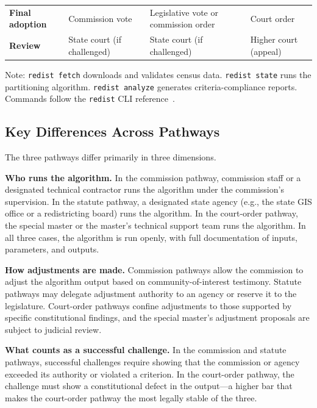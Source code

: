 \begin{table}[h]
\begin{threeparttable}
\begin{tabular}{p{2cm}p{3.5cm}p{3.5cm}p{3.5cm}}
\addlinespace
\textbf{Final adoption} &
Commission vote &
Legislative vote or commission order &
Court order \\
\addlinespace
\textbf{Review} &
State court (if challenged) &
State court (if challenged) &
Higher court (appeal) \\
\bottomrule
\end{tabular}
\begin{tablenotes}
\small
\item Note: \texttt{redist fetch} downloads and validates census data.
  \texttt{redist state} runs the partitioning algorithm.
  \texttt{redist analyze} generates criteria-compliance reports.
  Commands follow the \texttt{redist} CLI reference~\citep{redistCliQuickstart}.
\end{tablenotes}
\end{threeparttable}
\end{table}

\subsection{Key Differences Across Pathways}

The three pathways differ primarily in three dimensions.

\textbf{Who runs the algorithm.}  In the commission pathway, commission staff
or a designated technical contractor runs the algorithm under the commission's
supervision.  In the statute pathway, a designated state agency (e.g., the
state GIS office or a redistricting board) runs the algorithm.  In the
court-order pathway, the special master or the master's technical support team
runs the algorithm.  In all three cases, the algorithm is run openly, with
full documentation of inputs, parameters, and outputs.

\textbf{How adjustments are made.}  Commission pathways allow the commission
to adjust the algorithm output based on community-of-interest testimony.
Statute pathways may delegate adjustment authority to an agency or reserve it
to the legislature.  Court-order pathways confine adjustments to those
supported by specific constitutional findings, and the special master's
adjustment proposals are subject to judicial review.

\textbf{What counts as a successful challenge.}  In the commission and statute
pathways, successful challenges require showing that the commission or agency
exceeded its authority or violated a criterion.  In the court-order pathway,
the challenge must show a constitutional defect in the output---a higher bar
that makes the court-order pathway the most legally stable of the three.
